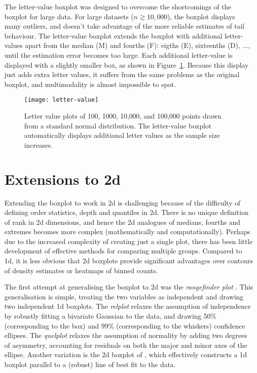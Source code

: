 \documentclass[oneside]{article}
\begin{document}
The letter-value boxplot \citep{hofmann:2006a} was designed to overcome the shortcomings of the boxplot for large data. For large datasets ($n \gtrsim 10,000$), the boxplot displays many outliers, and doesn't take advantage of the more reliable estimates of tail behaviour. The letter-value boxplot extends the boxplot with additional letter-values apart from the median (M) and fourths (F): eigths (E), sixteenths (D), ..., until the estimation error becomes too large. Each additional letter-value is displayed with a slightly smaller box, as shown in Figure~\ref{fig:letter-value}. Because this display just adds extra letter values, it suffers from the same problems as the original boxplot, and multimodality is almost impossible to spot.

\begin{figure}[htbp]
  \centering
  \texttt{[image: letter-value]}
  \caption{Letter value plots of 100, 1000, 10,000, and 100,000 points drawn from a standard normal distribution.  The letter-value boxplot automatically displays additional letter values as the sample size increases.}
  \label{fig:letter-value}
\end{figure}

\section{Extensions to 2d}
\label{sec:2d}

Extending the boxplot to work in 2d is challenging because of the difficulty of defining order statistics, depth and quantiles in 2d. There is no unique definition of rank in 2d dimensions, and hence the 2d analogues of medians, fourths and extremes becomes more complex (mathematically and computationally). Perhaps due to the increased complexity of creating just a single plot, there has been little development of effective methods for comparing multiple groups. Compared to 1d, it is less obvious that 2d boxplots provide significant advantages over contours of density estimates or heatmaps of binned counts.

The first attempt at generalising the boxplot to 2d was the \emph{rangefinder plot} \citep{becketti:1987}. This generalisation is simple, treating the two variables as independent and drawing two independent 1d boxplots. The \emph{relplot} \citep{goldberg:1992} relaxes the assumption of independence by robustly fitting a bivariate Gaussian to the data, and drawing 50\% (corresponding to the box) and 99\% (corresponding to the whiskers) confidence ellipses. The \emph{quelplot}\citep{goldberg:1992} relaxes the assumption of normality by adding two degrees of asymmetry, accounting for residuals on both the major and minor axes of the ellipse. Another variation is the 2d boxplot of \citet{tongkumchum:2005}, which effectively constructs a 1d boxplot parallel to a (robust) line of best fit to the data.
\end{document}
